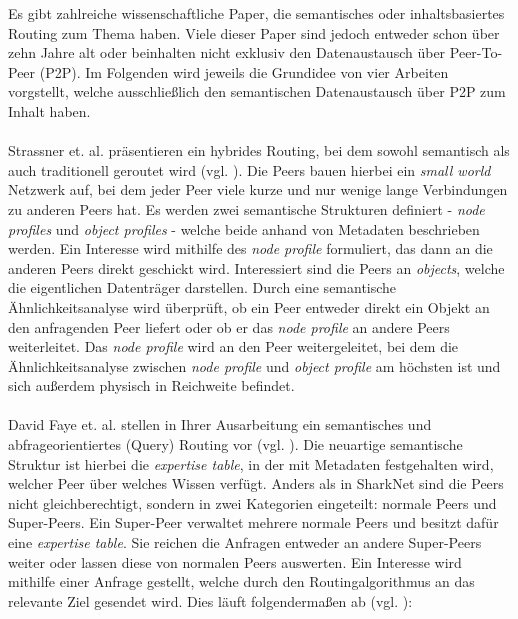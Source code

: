 Es gibt zahlreiche wissenschaftliche Paper, die semantisches oder inhaltsbasiertes Routing zum Thema haben. Viele dieser Paper sind jedoch entweder schon über zehn Jahre alt oder beinhalten nicht exklusiv den Datenaustausch über Peer-To-Peer (P2P). Im Folgenden wird jeweils die Grundidee von vier Arbeiten vorgstellt, welche ausschließlich den semantischen Datenaustausch über P2P zum Inhalt haben.\\\\
Strassner et. al. präsentieren ein hybrides Routing, bei dem sowohl semantisch als auch traditionell geroutet wird (vgl. \citet[S. 164ff]{Strassner2010}). Die Peers bauen hierbei ein \textit{small world} Netzwerk auf, bei dem jeder Peer viele kurze und nur wenige lange Verbindungen zu anderen Peers hat. Es werden zwei semantische Strukturen definiert - \textit{node profiles} und \textit{object profiles} - welche beide anhand von Metadaten beschrieben werden. Ein Interesse wird mithilfe des \textit{node profile} formuliert, das dann an die anderen Peers direkt geschickt wird. Interessiert sind die Peers an \textit{objects}, welche die eigentlichen Datenträger darstellen. Durch eine semantische Ähnlichkeitsanalyse wird überprüft, ob ein Peer entweder direkt ein Objekt an den anfragenden Peer liefert oder ob er das \textit{node profile} an andere Peers weiterleitet. Das \textit{node profile} wird an den Peer weitergeleitet, bei dem die Ähnlichkeitsanalyse zwischen \textit{node profile} und \textit{object profile} am höchsten ist und sich außerdem physisch in Reichweite befindet. \\\\
David Faye et. al. stellen in Ihrer Ausarbeitung ein semantisches und abfrageorientiertes (Query) Routing vor (vgl. \citet[S. 365f]{Faye2007}). Die neuartige semantische Struktur ist hierbei die \textit{expertise table}, in der mit Metadaten festgehalten wird, welcher Peer über welches Wissen verfügt. Anders als in SharkNet sind die Peers nicht gleichberechtigt, sondern in zwei Kategorien eingeteilt: normale Peers und Super-Peers. Ein Super-Peer verwaltet mehrere normale Peers und besitzt dafür eine \textit{expertise table}. Sie reichen die Anfragen entweder an andere Super-Peers weiter oder lassen diese von normalen Peers auswerten. Ein Interesse wird mithilfe einer Anfrage gestellt, welche durch den Routingalgorithmus an das relevante Ziel gesendet wird. Dies läuft folgendermaßen ab (vgl. \citet[S. 370f]{Faye2007}):
